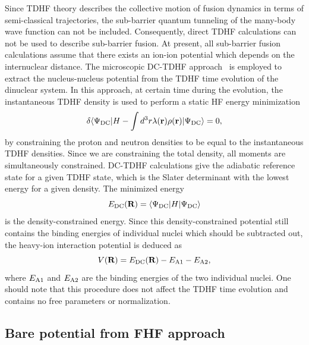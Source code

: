Since TDHF theory describes the collective motion of fusion dynamics in terms of semi-classical trajectories, the sub-barrier quantum
tunneling of the many-body wave function can not be included. Consequently, direct TDHF calculations can not be used to describe sub-barrier fusion.
At present, all sub-barrier fusion calculations assume that there exists an ion-ion potential which depends on the internuclear distance.
The microscopic DC-TDHF approach~\citep{Umar2006_PRC74-021601} is employed to extract the nucleus-nucleus potential from the TDHF time evolution of the dinuclear system.
In this approach, at certain time during the evolution, the instantaneous TDHF density is used to perform a static HF energy minimization
\begin{equation}
\delta \langle \Psi_{\rm DC}|H-\int d^3r \lambda(\textbf{r})\rho(\textbf{r})|\Psi_{\rm DC}\rangle=0,
\end{equation}
by constraining the proton and neutron densities to be equal to the instantaneous TDHF densities. Since we are constraining the total density,
all moments are simultaneously constrained. DC-TDHF calculations give the adiabatic reference state for a given TDHF state, which is the Slater
determinant with the lowest energy for a given density.
The minimized energy
\begin{equation}
E_{\rm {DC}}(\textbf R)=\langle \Psi_{\rm DC}|H|\Psi_{\rm DC}\rangle
\end{equation}
is the density-constrained energy.
Since this density-constrained potential still contains the binding energies of individual nuclei which should be subtracted out,
the heavy-ion interaction potential is deduced as
\begin{equation}
V(\textbf R)=E_{\rm {DC}}(\textbf R)-E_{\rm {A1}}-E_{\rm {A2}},
\label{VB}
\end{equation}
where $E_{\rm {A1}}$ and $E_{\rm {A2}}$ are the binding energies of the two individual nuclei.
One should note that this procedure does not affect the TDHF time evolution and contains no free parameters or normalization.

\subsection{Bare potential from FHF approach}

